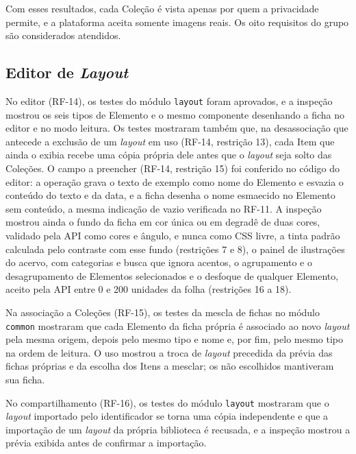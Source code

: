 Com esses resultados, cada Coleção é vista apenas por quem a privacidade permite, e a plataforma aceita somente imagens reais. Os oito requisitos do grupo
são considerados atendidos.

\subsection{Editor de \textit{Layout}}

No editor (RF-14), os testes do módulo \texttt{layout} foram aprovados, e a inspeção mostrou os seis tipos de Elemento e o mesmo componente desenhando
a ficha no editor e no modo leitura. Os testes mostraram também que, na desassociação que antecede a exclusão de um \textit{layout} em uso (RF-14,
restrição 13), cada Item que ainda o exibia recebe uma cópia própria dele antes que o \textit{layout} seja solto das Coleções. O campo a preencher (RF-14,
restrição 15) foi conferido no código do editor: a operação grava o texto de exemplo como nome do Elemento e esvazia o conteúdo do texto e da data, e a
ficha desenha o nome esmaecido no Elemento sem conteúdo, a mesma indicação de vazio verificada no RF-11. A inspeção mostrou ainda o fundo da ficha em cor
única ou em degradê de duas cores, validado pela API como cores e ângulo, e nunca como CSS livre, a tinta padrão calculada pelo contraste com esse fundo
(restrições 7 e 8), o painel de ilustrações do acervo, com categorias e busca que ignora acentos, o agrupamento e o desagrupamento de Elementos selecionados
e o desfoque de qualquer Elemento, aceito pela API entre 0 e 200 unidades da folha (restrições 16 a 18).

Na associação a Coleções (RF-15), os testes da mescla de fichas no módulo \texttt{common} mostraram que cada Elemento da ficha própria é associado ao novo
\textit{layout} pela mesma origem, depois pelo mesmo tipo e nome e, por fim, pelo mesmo tipo na ordem de leitura. O uso mostrou a troca de \textit{layout}
precedida da prévia das fichas próprias e da escolha dos Itens a mesclar; os não escolhidos mantiveram sua ficha.

No compartilhamento (RF-16), os testes do módulo \texttt{layout} mostraram que o \textit{layout} importado pelo identificador se torna uma cópia independente
e que a importação de um \textit{layout} da própria biblioteca é recusada, e a inspeção mostrou a prévia exibida antes de confirmar a importação.

